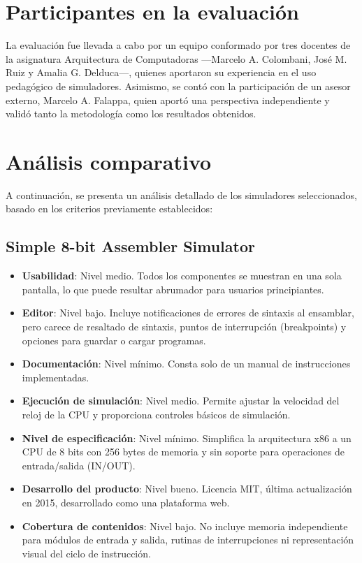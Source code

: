 \documentclass[12pt,oneside]{templates/unerthesis}
\providecommand{\tightlist}{%
  \setlength{\itemsep}{0pt}\setlength{\parskip}{0pt}}
\begin{document}
\hypertarget{participantes-en-la-evaluaciuxf3n}{%
\section{Participantes en la evaluación}\label{participantes-en-la-evaluaciuxf3n}}

La evaluación fue llevada a cabo por un equipo conformado por tres docentes de la asignatura Arquitectura de Computadoras ---Marcelo A. Colombani, José M. Ruiz y Amalia G. Delduca---, quienes aportaron su experiencia en el uso pedagógico de simuladores. Asimismo, se contó con la participación de un asesor externo, Marcelo A. Falappa, quien aportó una perspectiva independiente y validó tanto la metodología como los resultados obtenidos.

\hypertarget{anuxe1lisis-comparativo}{%
\section{Análisis comparativo}\label{anuxe1lisis-comparativo}}

A continuación, se presenta un análisis detallado de los simuladores seleccionados, basado en los criterios previamente establecidos:

\hypertarget{simple-8-bit-assembler-simulator}{%
\subsection{Simple 8-bit Assembler Simulator}\label{simple-8-bit-assembler-simulator}}

\begin{itemize}
\tightlist
\item
  \textbf{Usabilidad}: Nivel medio. Todos los componentes se muestran en una sola pantalla, lo que puede resultar abrumador para usuarios principiantes.
\item
  \textbf{Editor}: Nivel bajo. Incluye notificaciones de errores de sintaxis al ensamblar, pero carece de resaltado de sintaxis, puntos de interrupción (breakpoints) y opciones para guardar o cargar programas.
\item
  \textbf{Documentación}: Nivel mínimo. Consta solo de un manual de instrucciones implementadas.
\item
  \textbf{Ejecución de simulación}: Nivel medio. Permite ajustar la velocidad del reloj de la CPU y proporciona controles básicos de simulación.
\item
  \textbf{Nivel de especificación}: Nivel mínimo. Simplifica la arquitectura x86 a un CPU de 8 bits con 256 bytes de memoria y sin soporte para operaciones de entrada/salida (IN/OUT).
\item
  \textbf{Desarrollo del producto}: Nivel bueno. Licencia MIT, última actualización en 2015, desarrollado como una plataforma web.
\item
  \textbf{Cobertura de contenidos}: Nivel bajo. No incluye memoria independiente para módulos de entrada y salida, rutinas de interrupciones ni representación visual del ciclo de instrucción.
\end{itemize}
\end{document}
